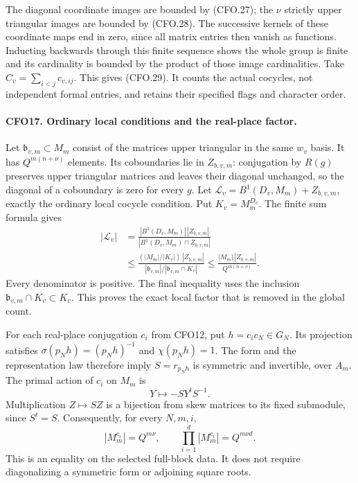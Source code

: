 The diagonal coordinate images are bounded by (CFO.27);
the $\nu$ strictly upper triangular images are bounded
by (CFO.28).  The successive kernels of these coordinate
maps end in zero, since all matrix entries then vanish
as functions.  Inducting backwards through this finite
sequence shows the whole group is finite and its
cardinality is bounded by the product of those image
cardinalities.  Take
$C_v=\sum_{i<j}c_{v,ij}$.  This gives (CFO.29).
It counts the actual cocycles, not independent formal
entries, and retains their specified flags and character
order.

\paragraph{CFO17. Ordinary local conditions and the real-place factor.}
\label{claim:CFO17}
Let $\mathfrak b_{v,m}\subset M_m$ consist of the matrices
upper triangular in the same $w_v$ basis.  It has
$Q^{m(n+\nu)}$ elements.  Its coboundaries lie in
$Z_{b,v,m}$: conjugation by $R(g)$ preserves upper
triangular matrices and leaves their diagonal unchanged,
so the diagonal of a coboundary is zero for every $g$.
Let
$\mathcal L_v=B^1(D_v,M_m)+Z_{b,v,m}$, exactly the
ordinary local cocycle condition.  Put
$K_v=M_m^{D_v}$.  The finite sum formula gives
\[
 \begin{split}
 |\mathcal L_v|
 &=\frac{|B^1(D_v,M_m)|\,|Z_{b,v,m}|}
          {|B^1(D_v,M_m)\cap Z_{b,v,m}|}\\
 &\le
 \frac{(|M_m|/|K_v|)\,|Z_{b,v,m}|}
      {|\mathfrak b_{v,m}|/|\mathfrak b_{v,m}\cap K_v|}
 \le \frac{|M_m|\,|Z_{b,v,m}|}{Q^{m(n+\nu)}} .
 \end{split}                                                     \tag{CFO.30}
\]
Every denominator is positive.  The final inequality
uses the inclusion $\mathfrak b_{v,m}\cap K_v\subset K_v$.
This proves the exact local factor that is removed in
the global count.

For each real-place conjugation $c_i$ from CFO12, put
$h=c_i c_N\in G_N$.  Its projection satisfies
$\sigma(p_Nh)=(p_Nh)^{-1}$ and $\chi(p_Nh)=1$.
The form and the representation law therefore imply
$S=r_{p_Nh}$ is symmetric and invertible, over $A_m$.
The primal action of $c_i$ on $M_m$ is
\[
                         Y\longmapsto-SY^tS^{-1}.
 \]
Multiplication $Z\mapsto SZ$ is a bijection from skew
matrices to its fixed submodule, since $S^t=S$.
Consequently, for every $N,m,i$,
\[
 |M_m^{c_i}|=Q^{m\nu},\qquad
 \prod_{i=1}^{d}|M_m^{c_i}|=Q^{m\nu d}.                          \tag{CFO.31}
\]
This is an equality on the selected full-block data.
It does not require diagonalizing a symmetric form or
adjoining square roots.

